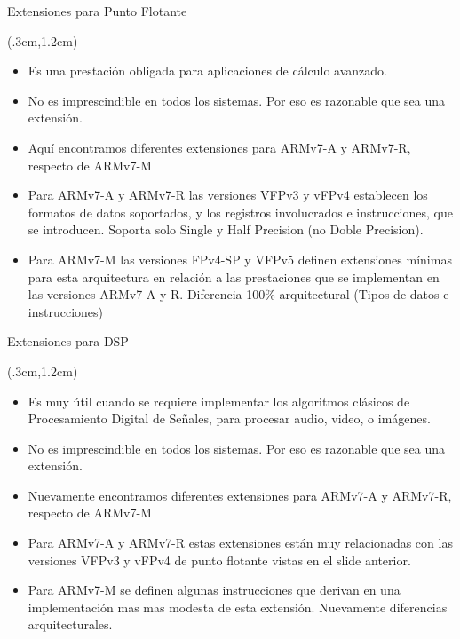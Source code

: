 \documentclass[usenames,table,dvipsnames,aspectratio=169]{beamer}
\begin{document}
\begin{frame}{Extensiones para Punto Flotante}
 \begin{textblock*}{\textwidth}(.3cm,1.2cm)
  \begin{itemize}[<+(1)->]\justifying\parskip 0.3cm
   \item Es una prestación obligada para aplicaciones de cálculo avanzado.
   \item No es imprescindible en todos los sistemas. Por eso es razonable que sea una extensión.
   \item Aquí encontramos diferentes extensiones para ARMv7-A y ARMv7-R, respecto de ARMv7-M
   \item Para ARMv7-A y ARMv7-R las versiones VFPv3 y vFPv4 establecen los formatos de datos soportados, y los registros involucrados e instrucciones, que se introducen. Soporta solo Single y Half Precision (no Doble Precision).
   \item Para ARMv7-M las versiones FPv4-SP y VFPv5 definen extensiones mínimas para esta arquitectura en relación a las prestaciones que se implementan en las versiones ARMv7-A y R. Diferencia 100\% arquitectural (Tipos de datos e instrucciones)
  \end{itemize}
\end{textblock*}
\end{frame}

\begin{frame}{Extensiones para DSP}
 \begin{textblock*}{\textwidth}(.3cm,1.2cm)
  \begin{itemize}[<+(1)->] \justifying \parskip 0.3cm
   \item Es muy útil cuando se requiere implementar los algoritmos clásicos de Procesamiento Digital de Señales, para procesar audio, video, o imágenes.
   \item No es imprescindible en todos los sistemas. Por eso es razonable que sea una extensión.
   \item Nuevamente encontramos diferentes extensiones para ARMv7-A y ARMv7-R, respecto de ARMv7-M
   \item Para ARMv7-A y ARMv7-R estas extensiones están muy relacionadas con las versiones VFPv3 y vFPv4 de punto flotante vistas en el slide anterior.
   \item Para ARMv7-M se definen algunas instrucciones que derivan en una implementación mas mas modesta de esta extensión. Nuevamente diferencias arquitecturales.
  \end{itemize}
 \end{textblock*}
\end{frame}
\end{document}
